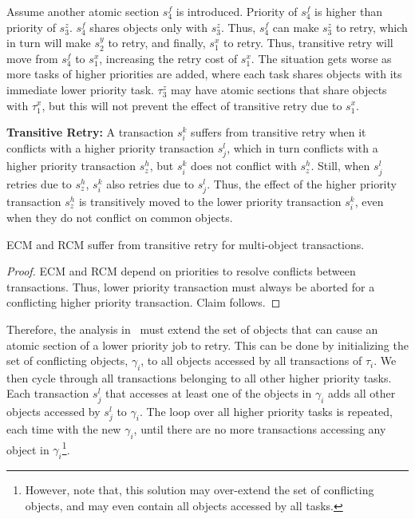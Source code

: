 Assume another atomic section $s_4^f$ is introduced. Priority of $s_4^f$ is higher than priority of $s_3^z$. $s_4^f$ shares objects only with $s_3^z$. Thus, $s_4^f$ can make $s_3^z$ to retry, which in turn will make $s_2^y$ to retry, and finally, $s_1^x$ to retry. Thus, transitive retry will move from $s_{4}^{f}$ to $s_{1}^{x}$, increasing the retry cost of $s_{1}^{x}$. 
The situation gets worse as more tasks of higher priorities are added, where each task
shares objects with its immediate lower priority task. $\tau_{3}^{z}$
may have atomic sections that share objects with $\tau_{1}^{x}$,
but this will not prevent the effect of transitive retry due to $s_{1}^{x}$.

\begin{mydef}
\textbf{Transitive Retry:} A transaction $s_{i}^{k}$ suffers from
transitive retry when it conflicts with a higher priority transaction
$s_{j}^{l}$, which in turn conflicts with a higher priority transaction
$s_{z}^{h}$, but $s_{i}^{k}$ does not conflict with $s_{z}^{h}$.
Still, when $s_{j}^{l}$ retries due to $s_{z}^{h}$, $s_{i}^{k}$
also retries due to $s_{j}^{l}$. Thus, the effect of the higher priority
transaction $s_{z}^{h}$ is transitively moved to the lower priority
transaction $s_{i}^{k}$, even when they do not conflict on common objects.
\end{mydef}

\begin{clm}\label{ecm-rcm-transitive-retry}
ECM and RCM suffer from transitive retry for multi-object transactions.
\end{clm}
\begin{proof}
ECM and RCM depend on priorities to resolve conflicts between transactions. Thus, lower priority transaction must always be aborted for a conflicting higher priority transaction. Claim follows. 
\end{proof}

Therefore, the analysis in~\cite{stmconcurrencycontrol:emsoft11} must extend the set of objects that can cause an atomic section of a lower priority job to retry.  This can be done by initializing the set of conflicting objects, $\gamma_i$, to all objects accessed by all transactions of $\tau_i$. We then cycle through all transactions belonging to all other higher priority tasks. Each transaction $s_j^l$ that accesses at least one of the objects in $\gamma_i$ adds all other objects accessed by $s_j^l$ to $\gamma_i$. The loop over all higher priority tasks is repeated, each time with the new $\gamma_i$, until there are no more transactions accessing any object in $\gamma_i$\footnote{However, note that, this solution may over-extend the set of conflicting objects, and may even contain all objects accessed by all tasks.}.

